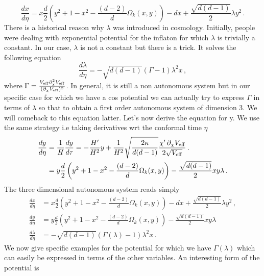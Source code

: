 \documentclass[a4paper]{article}
\begin{document}
\begin{equation}
  \frac{dx}{d\eta}=x \frac{d}{2}\left(y^2+1-x^2-\frac{(d-2)}{d}\Omega_k(x,y)\right)-dx+\frac{\sqrt{d(d-1)}}{2}\lambda y^2\,.
\end{equation}
There is a historical reason why $\lambda$ was introduced in cosmology. Initially, people were dealing with exponential potential for the inflaton for which $\lambda$ is trivially a constant. In our case, $\lambda$ is not a constant but there is a trick. It solves the following equation
\begin{equation}
  \frac{d\lambda}{d\eta} = -\sqrt{d(d-1)}(\Gamma-1)\lambda^2 x\,,
\end{equation}
where $\Gamma=\frac{V_{\rm eff}\partial_\chi^2 V_{\rm eff}}{(\partial_\chi V_{\rm eff})^2}$. In general, it is still a non autonomous system but in our specific case for which we have a cos potential we can actually try to express $\Gamma$ in terms of $\lambda$ so that to obtain a first order autonomous system of dimension 3. We will comeback to this equation latter. Let's now derive the equation for y. We use the same strategy i.e taking derivatives wrt the conformal time $\eta$
\begin{equation}
  \begin{aligned}
    \frac{dy}{d\eta}&=\frac{1}{H}\frac{dy}{d\tau} = -\frac{H'}{H^2}y+\frac{1}{H^2}\sqrt{\frac{2\kappa}{d(d-1)}}\frac{\chi' \,\partial_\chi V_{\rm eff}}{2 \sqrt{V_{\rm eff}}}\,.\\
    &=y\frac{d}{2}\left(y^2+1-x^2-\frac{(d-2)}{d}\Omega_k(x,y)\right)-\frac{\sqrt{d(d-1)}}{2} x y \lambda\,.
  \end{aligned}
\end{equation}
The three dimensional autonomous system reads simply
\begin{equation}\label{eq:thirdorderautonomousystem}
  \begin{aligned}
    \frac{dx}{d\eta}&=x \frac{d}{2}\left(y^2+1-x^2-\frac{(d-2)}{d}\Omega_k(x,y)\right)-dx+\frac{\sqrt{d(d-1)}}{2}\lambda y^2\,,\\
    \frac{dy}{d\eta} &=y\frac{d}{2}\left(y^2+1-x^2-\frac{(d-2)}{d}\Omega_k(x,y)\right)-\frac{\sqrt{d(d-1)}}{2} x y \lambda\,\\
    \frac{d\lambda}{d\eta} &= -\sqrt{d(d-1)}(\Gamma(\lambda)-1)\lambda^2 x\,.
  \end{aligned}
\end{equation}
We now give specific examples for the potential for which we have $\Gamma(\lambda)$ which can easily be expressed in terms of the other variables. An interesting form of the potential is
\end{document}
